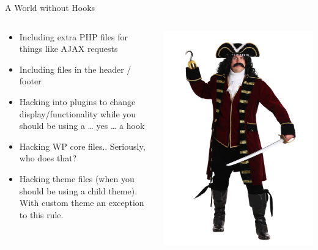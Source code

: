 \documentclass[10pt]{beamer}
\begin{document}
    \begin{frame}{A World without Hooks}
        \begin{columns}
            \begin{column}{0.5\textwidth}
                \begin{itemize}
                    \item Including extra PHP files for things like AJAX requests
                    \item Including files in the header / footer
                    \item Hacking into plugins to change display/functionality while you should be using a … yes … a hook
                    \item Hacking WP core files.. Seriously, who does that? 
                    \item Hacking theme files (when you should be using a child theme). With custom theme an exception to this rule.   
                \end{itemize}
            \end{column}
            \begin{column}{0.5\textwidth}
                \begin{center}
                    \includegraphics[width=1\textwidth]{images/someasshole}
                \end{center}
            \end{column}
        \end{columns}
    \end{frame}
\end{document}
